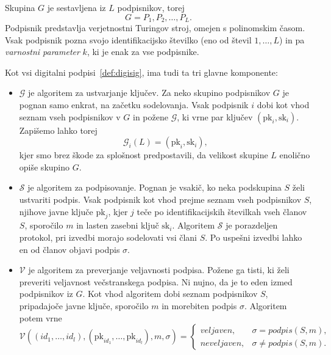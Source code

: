 \documentclass[isrm2, tisk]{fmfdelo}
\begin{document}
\begin{definicija} 
    Skupina $G$ je sestavljena iz $L$ podpisnikov, torej
    $$ 
    G = P_1, P_2, \dots, P_L.
    $$
    Podpisnik predstavlja verjetnostni Turingov stroj, omejen s polinomskim časom. Vsak podpisnik pozna 
    svojo identifikacijsko številko (eno od števil $1, \dots, L$) in pa \textit{varnostni parameter} $k$, 
    ki je enak za vse podpisnike.

    Kot vsi digitalni podpisi~\ref{def:digisig}, ima tudi ta tri glavne komponente: 
    \begin{itemize}
        \item $\mathcal{G}$ je algoritem za ustvarjanje ključev. Za neko skupino podpisnikov $G$ je pognan samo 
            enkrat, na začetku sodelovanja. Vsak podpisnik $i$ dobi kot vhod seznam vseh podpisnikov v $G$ 
            in požene $\mathcal{G}$, ki vrne par ključev $(\text{pk}_i, \text{sk}_i)$. Zapišemo lahko torej 
            $$ 
            \mathcal{G}_i(L) = (\text{pk}_i, \text{sk}_i),
            $$
            kjer smo brez škode za splošnost predpostavili, da velikost skupine $L$ enolično opiše 
            skupino $G$.
        \item $\mathcal{S}$ je algoritem za podpisovanje. Pognan je vsakič, ko neka podskupina $S$ želi 
            ustvariti podpis. Vsak podpisnik kot vhod prejme seznam vseh podpisnikov $S$, njihove 
            javne ključe $\text{pk}_j$, kjer $j$ teče po identifikacijskih številkah vseh članov $S$, 
            sporočilo $m$ in lasten zasebni ključ $\text{sk}_i$. Algoritem $\mathcal{S}$ je porazdeljen 
            protokol, pri izvedbi morajo sodelovati vsi člani $S$. Po uspešni izvedbi lahko en od članov 
            objavi podpis $\sigma$.
        \item $\mathcal{V}$ je algoritem za preverjanje veljavnosti podpisa. Požene ga tisti, ki želi 
            preveriti veljavnost večstranskega podpisa. Ni nujno, da je to eden izmed podpisnikov iz $G$. 
            Kot vhod algoritem dobi seznam podpisnikov $S$, pripadajoče javne ključe, sporočilo $m$ in 
            morebiten podpis $\sigma$. Algoritem potem vrne
            $$ 
            \mathcal{V}((id_1, \dots, id_l), (\text{pk}_{id_1}, \dots, \text{pk}_{id_l}), m, \sigma) = 
            \begin{cases}
                veljaven, & \sigma = podpis(S, m), \\
                neveljaven, & \sigma \neq podpis(S, m).
            \end{cases}
            $$
    \end{itemize}
\end{definicija}
\end{document}
